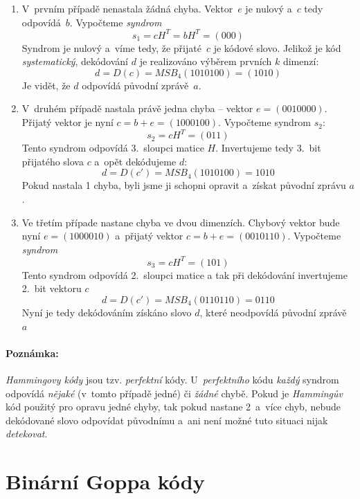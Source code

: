 \documentclass[thesis=M,czech,hidelinks]{FITthesis}[2012/06/26]
\newcommand{\0}{{\textcolor[gray]{0.75}{0}}}
\begin{document}
\begin{enumerate}
    \item V~prvním případě nenastala žádná chyba. Vektor~$e$ je
        nulový a~$c$ tedy odpovídá~$b$. Vypočteme \emph{syndrom}
        $$ s_1 = c H^T = b H^T = (000) $$
        Syndrom je nulový a~víme tedy, že přijaté~$c$ je kódové slovo.
        Jelikož je kód \emph{systematický}, dekódování $d$ je realizováno
        výběrem prvních $k$ dimenzí:
        $$ d = D(c) = MSB_4(1010100) = (1010) $$
        Je vidět, že $d$ odpovídá původní zprávě~$a$.

    \item V~druhém případě nastala právě jedna chyba -- vektor $e=(0010000)$.
        Přijatý vektor je nyní $c = b + e = (1000100)$. Vypočteme syndrom $s_2$:
        $$ s_2 = c H^T = (011) $$
        Tento syndrom odpovídá 3.~sloupci matice $H$. Invertujeme tedy 3.~bit
        přijatého slova $c$ a~opět dekódujeme $d$:
        $$ d = D(c') = MSB_4(1010100) = 1010 $$
        Pokud nastala 1 chyba, byli jsme ji schopni opravit a~získat původní
        zprávu $a$.

    \item Ve třetím případe nastane chyba ve dvou dimenzích. Chybový vektor bude
        nyní $e=(1000010)$ a~přijatý vektor $c = b + e = (0010110)$. Vypočteme
        \emph{syndrom}
        $$ s_3 = c H^T = (101) $$
        Tento syndrom odpovídá 2.~sloupci matice a tak při dekódování
        invertujeme 2.~bit vektoru $c$
        $$ d = D(c') = MSB_4(0110110) = 0110 $$
        Nyní je tedy dekódováním získáno slovo $d$, které neodpovídá původní
        zprávě $a$

\end{enumerate}

\paragraph{Poznámka:} \emph{Hammingovy kódy} jsou tzv. \emph{perfektní} kódy.
U~\emph{perfektního} kódu \emph{každý} syndrom odpovídá \emph{nějaké} (v~tomto
případě jedné) či \emph{žádné} chybě. Pokud je \emph{Hammingův} kód použitý pro
opravu jedné chyby, tak pokud nastane 2~a~více chyb, nebude dekódované slovo
odpovídat původnímu a~ani není možné tuto situaci nijak \emph{detekovat}.



\section{Binární Goppa kódy}\label{kap_goppa_kody}
\end{document}
